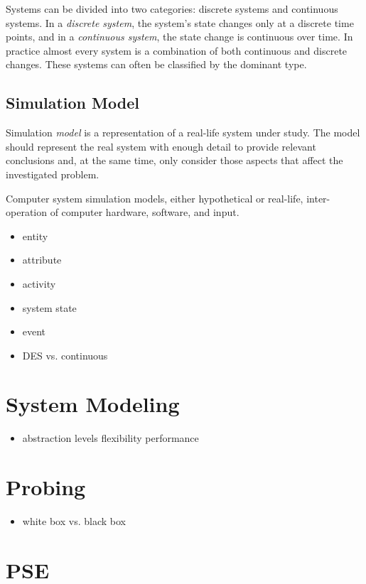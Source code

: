 Systems can be divided into two categories: discrete systems and continuous systems. In a \emph{discrete system}, the system's state changes only at a discrete time points, and in a \emph{continuous system}, the state change is continuous over time. In practice almost every system is a combination of both continuous and discrete changes. These systems can often be classified by the dominant type.

\subsection{Simulation Model}
\label{sec:simulation-model}

Simulation \emph{model} is a representation of a real-life system under study. The model should represent the real system with enough detail to provide relevant conclusions and, at the same time, only consider those aspects that affect the investigated problem. 

Computer system simulation models, either hypothetical or real-life, inter-operation of computer hardware, software, and input.

\begin{itemize}
\item entity
\item attribute
\item activity
\item system state
\item event
\end{itemize}

\begin{itemize}
\item DES vs. continuous
\end{itemize}

\section{System Modeling}
\begin{itemize}
\item abstraction levels
\subitem flexibility
\subitem performance
\end{itemize}

\section{Probing}
\begin{itemize}
\item white box vs. black box
\end{itemize}

\section{PSE}


